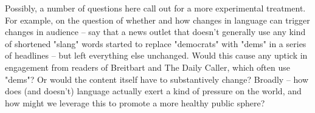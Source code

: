 \documentclass{scrartcl}
\begin{document}
Possibly, a number of questions here call out for a more experimental treatment. For example, on the question of whether and how changes in language can trigger changes in audience -- say that a news outlet that doesn't generally use any kind of shortened "slang" words started to replace "democrats" with "dems" in a series of headlines -- but left everything else unchanged. Would this cause any uptick in engagement from readers of Breitbart and The Daily Caller, which often use "dems"? Or would the content itself have to substantively change? Broadly -- how does (and doesn't) language actually exert a kind of pressure on the world, and how might we leverage this to promote a more healthy public sphere?

{}

\end{document}
